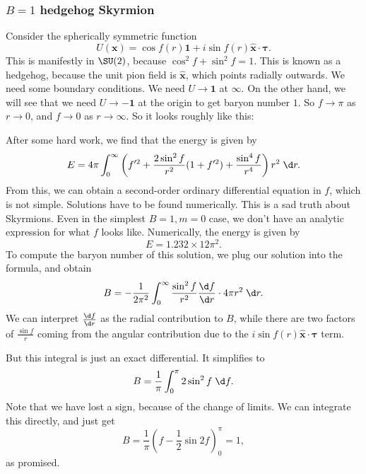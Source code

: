\documentclass[a4paper]{article}
\begin{document}
\subsubsection*{$B = 1$ hedgehog Skyrmion}
Consider the spherically symmetric function
\[
  U(\mathbf{x}) = \cos f(r) \mathbf{1} + i \sin f(r) \hat{\mathbf{x}} \cdot \boldsymbol\tau.
\]
This is manifestly in $\SU(2)$, because $\cos^2 f + \sin^2 f = 1$. This is known as a hedgehog, because the unit pion field is $\hat{\mathbf{x}}$, which points radially outwards. We need some boundary conditions. We need $U \to \mathbf{1}$ at $\infty$. On the other hand, we will see that we need $U \to -\mathbf{1}$ at the origin to get baryon number $1$. So $f \to \pi$ as $r \to 0$, and $f \to 0$ as $r \to \infty$. So it looks roughly like this:
\begin{center}
\end{center}
After some hard work, we find that the energy is given by
\[
  E = 4\pi \int_0^\infty \left(f'^2 + \frac{2 \sin^2 f}{r^2}(1 + f'^2) + \frac{\sin^4 f}{r^4}\right) r^2\;\d r.
\]
From this, we can obtain a second-order ordinary differential equation in $f$, which is not simple. Solutions have to be found numerically. This is a sad truth about Skyrmions. Even in the simplest $B = 1, m = 0$ case, we don't have an analytic expression for what $f$ looks like. Numerically, the energy is given by
\[
  E = 1.232 \times 12\pi^2.
\]
To compute the baryon number of this solution, we plug our solution into the formula, and obtain
\[
  B = - \frac{1}{2\pi^2} \int_0^\infty \frac{\sin^2 f}{r^2} \frac{\d f}{\d r} \cdot 4\pi r^2 \;\d r.
\]
We can interpret $\frac{\d f}{\d r}$ as the radial contribution to $B$, while there are two factors of $\frac{\sin f}{r}$ coming from the angular contribution due to the $i \sin f(r) \hat{\mathbf{x}} \cdot \boldsymbol\tau$ term.

But this integral is just an exact differential. It simplifies to
\[
  B = \frac{1}{\pi} \int_0^\pi 2 \sin^2 f \;\d f.
\]
Note that we have lost a sign, because of the change of limits. We can integrate this directly, and just get
\[
  B = \frac{1}{\pi}\left(f - \frac{1}{2} \sin 2f\right)^\pi_0 = 1,
\]
as promised.
\end{document}
